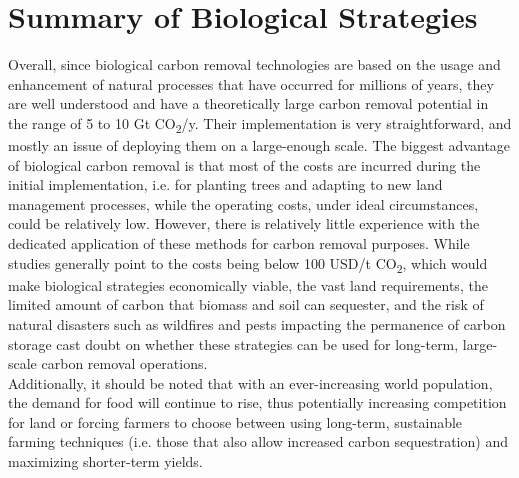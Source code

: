 \section{Summary of Biological Strategies}
Overall, since biological carbon removal technologies are based on the usage and enhancement of natural processes that have occurred for millions of years, they are well understood and have a theoretically large carbon removal potential in the range of 5 to 10 Gt CO\textsubscript{2}/y. Their implementation is very straightforward, and mostly an issue of deploying them on a large-enough scale. The biggest advantage of biological carbon removal is that most of the costs are incurred during the initial implementation, i.e. for planting trees and adapting to new land management processes, while the operating costs, under ideal circumstances, could be relatively low. However, there is relatively little experience with the dedicated application of these methods for carbon removal purposes. While studies generally point to the costs being below 100 USD/t CO\textsubscript{2}, which would make biological strategies economically viable, the vast land requirements, the limited amount of carbon that biomass and soil can sequester, and the risk of natural disasters such as wildfires and pests impacting the permanence of carbon storage cast doubt on whether these strategies can be used for long-term, large-scale carbon removal operations.\\Additionally, it should be noted that with an ever-increasing world population, the demand for food will continue to rise, thus potentially increasing competition for land or forcing farmers to choose between using long-term, sustainable farming techniques (i.e. those that also allow increased carbon sequestration) and maximizing shorter-term yields.